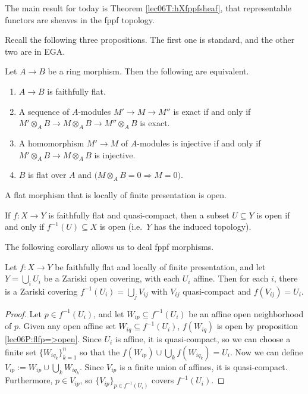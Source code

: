 

The main result for today is Theorem  \ref{lec06T:hXfppfsheaf}, that representable functors are sheaves in the fppf topology.

Recall the following three propositions. The first one is standard, and the other two are in EGA.
\begin{proposition}
 Let $A\to B$ be a ring morphism. Then the following are equivalent.
 \begin{enumerate}
  \item $A\to B$ is faithfully flat.
  \item A sequence of $A$-modules $M'\to M\to M''$ is exact if and only if $M'\otimes_A B\to M\otimes_A B\to M''\otimes_A B$ is exact.
  \item A homomorphism $M'\to M$ of $A$-modules is injective if and only if $M'\otimes_A B\to M\otimes_A B$ is injective.
  \item $B$ is flat over $A$ and $\bigl(M\otimes_A B=0 \Longrightarrow M=0\bigr)$.
 \end{enumerate}
\end{proposition}
\begin{proposition}\label{lec06P:flfp=>open}
 A flat morphism that is locally of finite presentation is open.
\end{proposition}
\begin{proposition}\label{lec06P:ffqc_induced_topology}
 If $f:X\to Y$ is faithfully flat and quasi-compact, then a subset $U\subseteq Y$ is open if and only if $f^{-1}(U)\subseteq X$ is open (i.e.~$Y$ has the induced topology).
\end{proposition}
The following corollary allows us to deal fppf morphisms.
\begin{corollary}\label{lec06C:fppf->qcmpt_cover}
 Let $f:X\to Y$ be faithfully flat and locally of finite presentation, and let $Y=\bigcup_i U_i$ be a Zariski open covering, with each $U_i$ affine. Then for each $i$, there is a Zariski covering $f^{-1}(U_i)=\bigcup_j V_{ij}$ with $V_{ij}$ quasi-compact and $f(V_{ij})=U_i$.
\end{corollary}
\begin{proof}
 Let $p\in f^{-1}(U_i)$, and let $W_{ip}\subseteq f^{-1}(U_i)$ be an affine open neighborhood of $p$. Given any open affine set $W_{iq}\subseteq f^{-1}(U_i)$, $f(W_{iq})$ is open by proposition \ref{lec06P:flfp=>open}. Since $U_i$ is affine, it is quasi-compact, so we can choose a finite set $\{W_{iq_k}\}_{k=1}^n$ so that the $f(W_{ip})\cup \bigcup_k f(W_{iq_k})=U_i$. Now we can define $V_{ip}:= W_{ip}\cup \bigcup_k W_{iq_k}$. Since $V_{ip}$ is a finite union of affines, it is quasi-compact. Furthermore, $p\in V_{ip}$, so $\{V_{ip}\}_{p\in f^{-1}(U_i)}$ covers $f^{-1}(U_i)$.
\end{proof}
